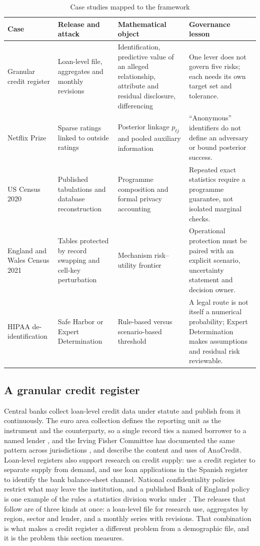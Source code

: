 \documentclass[11pt,a4paper]{article}
\theoremstyle{plain}
\theoremstyle{definition}
\begin{document}
\begin{table}[htbp]
\centering
\caption{Case studies mapped to the framework}
\label{tab:cases}
\small
\begin{tabular}{p{2.7cm}p{3.0cm}p{3.1cm}p{4.1cm}}
\toprule
Case & Release and attack & Mathematical object & Governance lesson \\
\midrule
Granular credit register & Loan-level file, aggregates and monthly revisions &
Identification, predictive value of an alleged relationship, attribute and
residual disclosure, differencing & One lever does not govern five risks; each
needs its own target set and tolerance. \\
Netflix Prize & Sparse ratings linked to outside ratings & Posterior linkage
$p_{tj}$ and pooled auxiliary information & ``Anonymous'' identifiers do not
define an adversary or bound posterior success. \\
US Census 2020 & Published tabulations and database reconstruction & Programme
composition and formal privacy accounting & Repeated exact statistics require
a programme guarantee, not isolated marginal checks. \\
England and Wales Census 2021 & Tables protected by record swapping and cell-key
perturbation & Mechanism risk--utility frontier & Operational protection must be
paired with an explicit scenario, uncertainty statement and decision owner. \\
HIPAA de-identification & Safe Harbor or Expert Determination & Rule-based versus
scenario-based threshold & A legal route is not itself a numerical probability;
Expert Determination makes assumptions and residual risk reviewable. \\
\bottomrule
\end{tabular}
\end{table}

\subsection{A granular credit register}\label{sec:credit}

Central banks collect loan-level credit data under statute and publish from it
continuously. The euro area collection defines the reporting unit as the
instrument and the counterparty, so a single record ties a named borrower to a
named lender \citep{ecb2022}, and the Irving Fisher Committee has documented the
same pattern across jurisdictions \citep{ifc2016}, and \citet{israel2017}
describe the content and uses of AnaCredit. Loan-level registers also support
research on credit supply: \citet{khwaja2008} use a credit register to separate
supply from demand, and \citet{jimenez2012} use loan applications in the Spanish
register to identify the bank balance-sheet channel. National confidentiality
policies restrict what may leave the institution, and a published Bank of England
policy is one example of the rules a statistics division works under
\citep{boe2023}. The releases that follow are of three kinds at once: a
loan-level file for research use, aggregates by region, sector and lender, and a
monthly series with revisions. That combination is what makes a credit register a
different problem from a demographic file, and it is the problem this section
measures.
\end{document}
